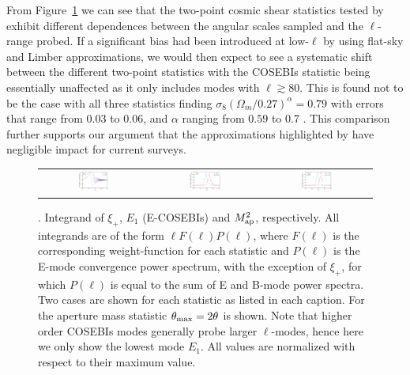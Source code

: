 From Figure~\ref{fig:filters} we can see that the two-point cosmic shear statistics tested by \citet{kilbinger/etal:2013} exhibit different dependences between the angular scales sampled and the $\ell$-range probed.   
If a significant bias had been introduced at low-$\ell$ by using flat-sky and Limber approximations, we would then expect to see a systematic shift between the different two-point statistics with the COSEBIs statistic being essentially unaffected as it only includes modes with $\ell \gtrsim 80$.  This is found not to be the case with all three statistics finding $\sigma_8 (\Omega_m/0.27)^\alpha = 0.79$ with errors that range from $0.03$ to $0.06$, and $\alpha$ ranging from $0.59$ to 0.7 \citep[see Table 5 of][]{kilbinger/etal:2013}.  This comparison further supports our argument that the approximations highlighted by \citet{kitching/etal:2016} have negligible impact for current surveys.

\begin{figure}[htb]
\begin{center}
\begin{tabular}{ccc}
\includegraphics[width=0.31\textwidth]{figures/IntegKsip.pdf} &
\includegraphics[width=0.31\textwidth]{figures/IntegCOSEBIs.pdf} &
\includegraphics[width=0.31\textwidth]{figures/IntegMap.pdf}
\end{tabular}
\caption{ \label{fig:filters}. Integrand of $\xi_+$, $E_1$ (E-COSEBIs) and $M^2_{\rm ap}$, respectively.
All integrands are of the form $\ell F(\ell) P(\ell)$, where $F(\ell)$ is the corresponding weight-function
for each statistic and $P(\ell)$ is the E-mode convergence power spectrum, with the exception of $\xi_+$, for which
$P(\ell)$ is equal to the sum of E and B-mode power spectra. 
Two cases are shown for each statistic as listed in each caption.
For the aperture mass statistic $\theta_{\rm max}=2\theta$ is shown. 
Note that higher order COSEBIs modes generally probe larger $\ell$-modes, 
hence here we only show the lowest mode $E_1$. All values are normalized with respect to their maximum value. 
}
\end{center}
\end{figure}


